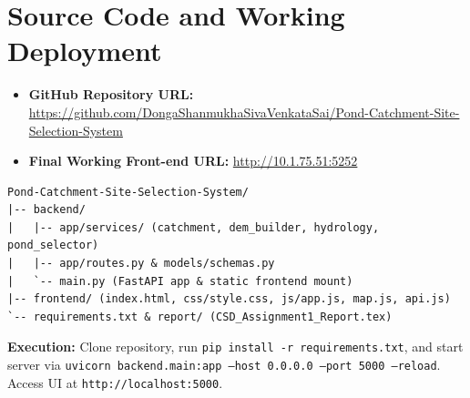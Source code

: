 \documentclass[manuscript,screen,review]{acmart}
\begin{document}
\appendix

\section{Source Code and Working Deployment}
\begin{itemize}
    \item \textbf{GitHub Repository URL:} \url{https://github.com/DongaShanmukhaSivaVenkataSai/Pond-Catchment-Site-Selection-System}
    \item \textbf{Final Working Front-end URL:} \url{http://10.1.75.51:5252}
\end{itemize}

\begin{verbatim}
Pond-Catchment-Site-Selection-System/
|-- backend/
|   |-- app/services/ (catchment, dem_builder, hydrology, pond_selector)
|   |-- app/routes.py & models/schemas.py
|   `-- main.py (FastAPI app & static frontend mount)
|-- frontend/ (index.html, css/style.css, js/app.js, map.js, api.js)
`-- requirements.txt & report/ (CSD_Assignment1_Report.tex)
\end{verbatim}

\textbf{Execution:} Clone repository, run \texttt{pip install -r requirements.txt}, and start server via \texttt{uvicorn backend.main:app --host 0.0.0.0 --port 5000 --reload}. Access UI at \texttt{http://localhost:5000}.
\end{document}
